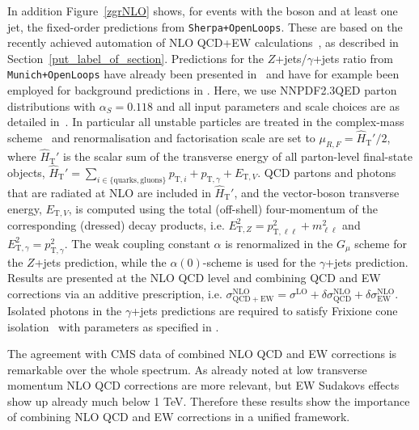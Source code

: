 \documentclass[11pt]{cernrep} \usepackage{graphicx,epsfig} 
\begin{document}
In addition Figure~\ref{zgrNLO} shows, for events with the boson and at least one
jet, the fixed-order predictions from {\tt Sherpa+OpenLoops}. These are based on the recently 
achieved automation of NLO QCD+EW 
calculations~\cite{Kallweit:2014xda,Kallweit:2015dum}, as described in 
Section~\ref{put_label_of_section}. Predictions for the $Z$+jets/$\gamma$+jets 
ratio from {\tt Munich+OpenLoops} have already been presented 
in~\cite{Kallweit:2015fta} and have for example been employed for background 
predictions in \cite{CMS:2015jdt}. Here, we use NNPDF2.3QED \cite{Ball:2013hta} 
parton distributions with $\alpha_S=0.118$ and all input parameters and scale 
choices are as detailed in~\cite{Kallweit:2015dum}. In particular all unstable 
particles are treated in the complex-mass scheme~\cite{Denner:2005fg} and  
renormalisation and factorisation scale are set to 
$\mu_{R,F}=\hat{H}_{\mathrm{T}}'/2$, where $\hat{H}_{\mathrm{T}}'$ is the scalar 
sum of the transverse energy of all parton-level final-state objects, 
$\hat{H}_{\mathrm{T}}' = \sum_{i\in \{\mathrm{quarks,gluons}\}} p_{\mathrm{T},i} 
+ p_{\mathrm{T},\gamma} + E_{\mathrm{T}, V}$. QCD partons and photons that are 
radiated at NLO are included in $\hat{H}_{\mathrm{T}}'$, and the vector-boson 
transverse energy, $E_{\mathrm{T},V}$,  is computed using the total (off-shell) 
four-momentum of the corresponding (dressed) decay products, i.e. 
$E^2_{\mathrm{T},Z}=p^2_{\mathrm{T},\ell\ell}+m_{\ell\ell}^2$ and 
$E^2_{\mathrm{T},\gamma}=p_{\mathrm{T},\gamma}^2$. The weak coupling constant 
$\alpha$ is renormalized in the $G_{\mu}$ scheme for the $Z$+jets prediction, 
while the $\alpha(0)$-scheme is used for the $\gamma$+jets prediction. Results 
are presented at the NLO QCD level and combining QCD and EW corrections via an 
additive prescription, i.e. $\sigma^{\mathrm{NLO}}_{\mathrm{QCD+EW}} =
\sigma^{\mathrm{LO}}+\delta\sigma^{\mathrm{NLO}}_{\mathrm{QCD}} + 
\delta\sigma^{\mathrm{NLO}}_{\mathrm{EW}}$. Isolated photons in the $\gamma$+jets 
predictions are required to satisfy Frixione cone isolation~\cite{Frixione} with parameters
as specified in \cite{Khachatryan:2015ira}.

The agreement with CMS data of combined NLO QCD and EW corrections is remarkable over
the whole spectrum. As already noted at low transverse momentum NLO QCD corrections are more relevant, but  
EW Sudakovs effects show up already much below 1 TeV. Therefore these results show the importance of combining NLO
QCD and EW corrections in a unified framework. 



\end{document}

